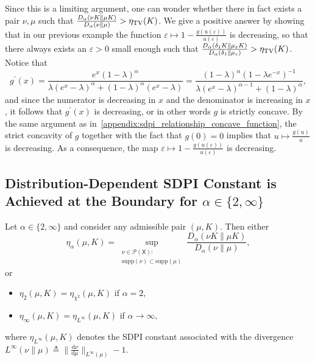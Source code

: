 \documentclass[conference,letterpaper]{IEEEtran}
\def \X{\mathsf X}
\def \calP{\mathcal P}
\def \supp {\mathrm{supp}}
\newcommand{\renyiDiv}[2]{D_{\alpha}\left(#1\|#2\right)}
\newcommand{\dd}[1]{\mathrm{d}#1}
\begin{document}
    Since this is a limiting argument, one can wonder whether there in fact exists a pair $\nu, \mu$ such that $\frac{\renyiDiv{\nu K}{\mu K}}{\renyiDiv{\nu}{\mu}}>\eta_{\rm TV}(K)$. We give a positive answer by showing that in our previous example the function $\varepsilon \mapsto 1 - \frac{g(u(\varepsilon))}{u(\varepsilon)}$ is decreasing, so that there always exists an $\varepsilon>0$ small enough such that $\frac{\renyiDiv{\delta_1 K}{\mu_\varepsilon K}}{\renyiDiv{\delta_1}{\mu_\varepsilon}} >\eta_{\rm TV}(K)$. Notice that
    \begin{equation*}
        g^\prime(x) = \frac{e^x(1-\lambda)^\alpha}{\lambda(e^x-\lambda)^\alpha + (1-\lambda)^\alpha(e^x-\lambda)} = \frac{(1-\lambda)^\alpha(1-\lambda e^{-x})^{-1}}{\lambda(e^x-\lambda)^{\alpha-1}+(1-\lambda)^\alpha},
    \end{equation*}
    and since the numerator is decreasing in $x$ and the denominator is increasing in $x$, it follows that $g^\prime(x)$ is decreasing, or in other words $g$ is strictly concave. By the same argument as in~\cref{appendix:sdpi_relationship_concave_function}, the strict concavity of $g$ together with the fact that $g(0)=0$ implies that $u\mapsto \frac{g(u)}{u}$ is decreasing. As a consequence, the map $\varepsilon\mapsto 1 - \frac{g(u(\varepsilon))}{u(\varepsilon)}$ is decreasing.
\subsection{Distribution-Dependent SDPI Constant is Achieved at the Boundary for $\alpha\in\{2, \infty\}$}\label{appendix:proof_boundary_nu}\noindent
    \begin{proposition}\label{prop:sdpi_achieved_by_boundary}
    Let $\alpha\in\{2, \infty\}$ and consider any admissible pair $(\mu, K)$. Then either
    \begin{equation*}
        \eta_\alpha(\mu, K) = \sup_{\substack{\nu\in\calP(\X):\\\supp(\nu)\subset\supp(\mu)}}\frac{\renyiDiv{\nu K}{\mu K}}{\renyiDiv{\nu}{\mu}},
    \end{equation*}
    or
    \begin{itemize}
        \item $\eta_2(\mu, K) = \eta_{\chi^2}(\mu, K)$ if $\alpha=2$,
        \item $\eta_\infty(\mu, K) = \eta_{L^\infty}(\mu, K)$ if $\alpha\to\infty$,
    \end{itemize}
    where $\eta_{L^\infty}(\mu, K)$ denotes the SDPI constant associated with the divergence $L^\infty(\nu\|\mu)\triangleq \|\frac{\dd\nu}{\dd\mu}\|_{L^\infty(\mu)}-1$.
    \end{proposition}
\end{document}
